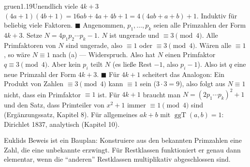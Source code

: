 \begin{loesungkarte}{gruen}{1.19}{Unendlich viele $4k + 3$}
$(4a + 1)(4b + 1) = 16ab + 4a + 4b + 1 = 4(4ab + a + b) + 1$. Induktiv für beliebig viele Faktoren. $\blacksquare$
Angenommen, $p_1, \dots, p_k$ seien alle Primzahlen der Form $4k + 3$. Setze $N = 4p_1p_2\cdots p_k - 1$. $N$ ist ungerade und $\equiv3\pmod4$. Alle Primfaktoren von $N$ sind ungerade, also $\equiv1$ oder $\equiv3\pmod4$. Wären alle $\equiv1$, so wäre $N\equiv1$ nach (a) --- Widerspruch. Also hat $N$ einen Primfaktor $q\equiv3\pmod4$. Aber kein $p_i$ teilt $N$ (es ließe Rest $-1$, also $p_i - 1$). Also ist $q$ eine neue Primzahl der Form $4k + 3$. $\blacksquare$
Für $4k + 1$ scheitert das Analogon: Ein Produkt von Zahlen $\equiv3\pmod4$ kann $\equiv1$ sein ($3\cdot3 = 9$), also folgt aus $N\equiv1$ nicht, dass ein Primfaktor $\equiv1$ ist. Für $4k + 1$ braucht man $N = (2p_1\cdots p_k)^{2} + 1$ und den Satz, dass Primteiler von $x^{2} + 1$ immer $\equiv1\pmod4$ sind (Ergänzungssatz, Kapitel 8). Für allgemeines $ak + b$ mit $\operatorname{ggT}(a, b) = 1$: Dirichlet 1837, analytisch (Kapitel 10).
\begin{mitnehmen}\kastentext
Euklids Beweis ist ein Bauplan: Konstruiere aus den bekannten Primzahlen eine Zahl, die eine unbekannte erzwingt. Für Restklassen funktioniert er genau dann elementar, wenn die \enquote{anderen} Restklassen multiplikativ abgeschlossen sind.
\end{mitnehmen}
\end{loesungkarte}

